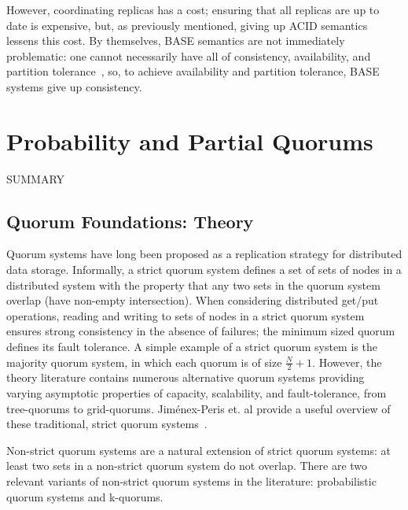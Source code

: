 \documentclass{vldb}
\begin{document}
However, coordinating replicas has a cost; ensuring that all replicas
are up to date is expensive, but, as previously mentioned, giving up
ACID semantics lessens this cost.  By themselves, BASE semantics are
not immediately problematic: one cannot necessarily have all of
consistency, availability, and partition tolerance~\cite{cap-proof},
so, to achieve availability and partition tolerance, BASE systems give
up consistency.


\section{Probability and Partial Quorums}
\label{sec:theory}

SUMMARY

\subsection{Quorum Foundations: Theory}

Quorum systems have long been proposed as a replication strategy for
distributed data storage.  Informally, a strict quorum system defines
a set of sets of nodes in a distributed system with the property that
any two sets in the quorum system overlap (have non-empty
intersection).  When considering distributed get/put operations,
reading and writing to sets of nodes in a strict quorum system ensures
strong consistency in the absence of failures; the minimum sized
quorum defines its fault tolerance.  A simple example of a strict
quorum system is the majority quorum system, in which each quorum is
of size $\frac{N}{2}+1$.  However, the theory literature contains
numerous alternative quorum systems providing varying asymptotic
properties of capacity, scalability, and fault-tolerance, from
tree-quorums to grid-quorums.  Jim\'{e}nex-Peris et. al provide a
useful overview of these traditional, strict quorum
systems~\cite{quorums-alternative}.

Non-strict quorum systems are a natural extension of strict quorum
systems: at least two sets in a non-strict quorum system do not
overlap.  There are two relevant variants of non-strict quorum systems in
the literature: probabilistic quorum systems and k-quorums.
\end{document}
